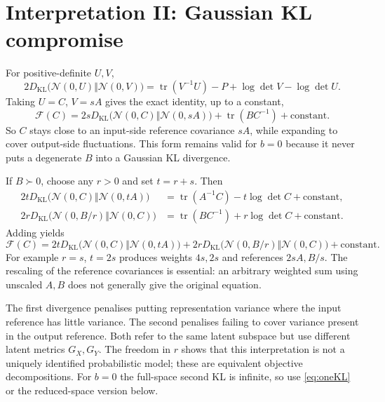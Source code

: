 \documentclass[11pt,a4paper]{article}
\newcommand{\tr}{\operatorname{tr}}
\newcommand{\KL}{D_{\mathrm{KL}}}
\newcommand{\N}{\mathcal N}
\newcommand{\F}{\mathcal F}
\begin{document}
\section{Interpretation II: Gaussian KL compromise}
For positive-definite $U,V$,
\begin{equation}\label{eq:KL}
 2\KL\bigl(\N(0,U)\Vert\N(0,V)\bigr)
 =\tr(V^{-1}U)-P+\log\det V-\log\det U.
\end{equation}
Taking $U=C$, $V=sA$ gives the exact identity, up to a constant,
\begin{equation}\label{eq:oneKL}
 \boxed{\F(C)=2s\KL\bigl(\N(0,C)\Vert\N(0,sA)\bigr)
 +\tr(BC^{-1})+\text{constant}.}
\end{equation}
So $C$ stays close to an input-side reference covariance $sA$, while
expanding to cover output-side fluctuations. This form remains valid for
$b=0$ because it never puts a degenerate $B$ into a Gaussian KL divergence.

If $B\succ0$, choose any $r>0$ and set $t=r+s$. Then
\begin{align}
 2t\KL\bigl(\N(0,C)\Vert\N(0,tA)\bigr)
 &=\tr(A^{-1}C)-t\log\det C+\text{constant},\\
 2r\KL\bigl(\N(0,B/r)\Vert\N(0,C)\bigr)
 &=\tr(BC^{-1})+r\log\det C+\text{constant}.
\end{align}
Adding yields
\begin{equation}\label{eq:twoKL}
 \boxed{\F(C)=2t\KL\bigl(\N(0,C)\Vert\N(0,tA)\bigr)
 +2r\KL\bigl(\N(0,B/r)\Vert\N(0,C)\bigr)+\text{constant}.}
\end{equation}
For example $r=s$, $t=2s$ produces weights $4s,2s$ and references
$2sA,B/s$. The rescaling of the reference covariances is essential:
an arbitrary weighted sum using unscaled $A,B$ does not generally give
the original equation.

The first divergence penalises putting representation variance where the
input reference has little variance. The second penalises failing to cover
variance present in the output reference. Both refer to the same latent
subspace but use different latent metrics $G_X,G_Y$.
The freedom in $r$ shows that this interpretation is not a uniquely
identified probabilistic model; these are equivalent objective decompositions.
For $b=0$ the full-space second KL is infinite, so use \eqref{eq:oneKL}
or the reduced-space version below.
\end{document}
